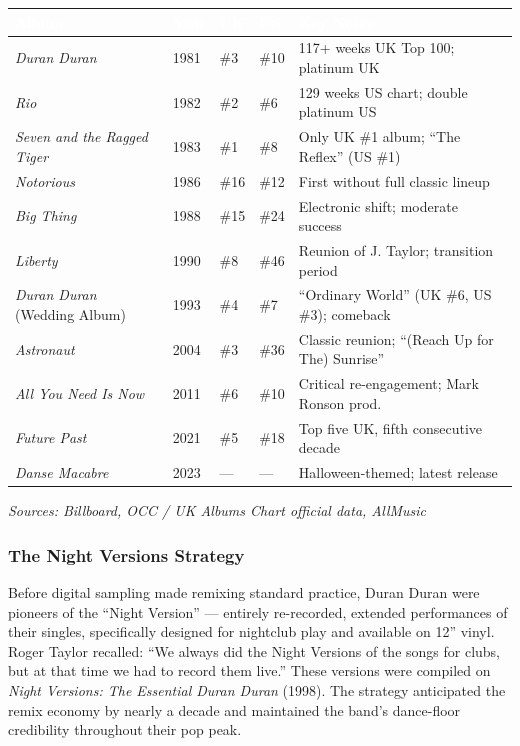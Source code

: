 \documentclass[11pt,letterpaper]{article}
\newcommand{\tableheader}[1]{\textbf{\sffamily\textcolor{white}{#1}}}
\begin{document}
\begin{center}
\begin{tabularx}{\textwidth}{L{4cm}C{1.5cm}C{1.5cm}C{1.5cm}X}
\toprule
{}
\tableheader{Album} & \tableheader{Year} & \tableheader{UK} & \tableheader{US} & \tableheader{Key Notes} \\
\midrule
\textit{Duran Duran} & 1981 & \#3 & \#10 & 117+ weeks UK Top 100; platinum UK \\
\textit{Rio} & 1982 & \#2 & \#6 & 129 weeks US chart; double platinum US \\
\textit{Seven and the Ragged Tiger} & 1983 & \#1 & \#8 & Only UK \#1 album; ``The Reflex'' (US \#1) \\
\textit{Notorious} & 1986 & \#16 & \#12 & First without full classic lineup \\
\textit{Big Thing} & 1988 & \#15 & \#24 & Electronic shift; moderate success \\
\textit{Liberty} & 1990 & \#8 & \#46 & Reunion of J. Taylor; transition period \\
\textit{Duran Duran} (Wedding Album) & 1993 & \#4 & \#7 & ``Ordinary World'' (UK \#6, US \#3); comeback \\
\textit{Astronaut} & 2004 & \#3 & \#36 & Classic reunion; ``(Reach Up for The) Sunrise'' \\
\textit{All You Need Is Now} & 2011 & \#6 & \#10 & Critical re-engagement; Mark Ronson prod. \\
\textit{Future Past} & 2021 & \#5 & \#18 & Top five UK, fifth consecutive decade \\
\textit{Danse Macabre} & 2023 & --- & --- & Halloween-themed; latest release \\
\bottomrule
\end{tabularx}
\end{center}

\textit{Sources: Billboard, OCC / UK Albums Chart official data, AllMusic}

\subsubsection{The Night Versions Strategy}

Before digital sampling made remixing standard practice, Duran Duran were pioneers of the ``Night Version'' --- entirely re-recorded, extended performances of their singles, specifically designed for nightclub play and available on 12'' vinyl. Roger Taylor recalled: ``We always did the Night Versions of the songs for clubs, but at that time we had to record them live.'' These versions were compiled on \textit{Night Versions: The Essential Duran Duran} (1998). The strategy anticipated the remix economy by nearly a decade and maintained the band's dance-floor credibility throughout their pop peak.
\end{document}
